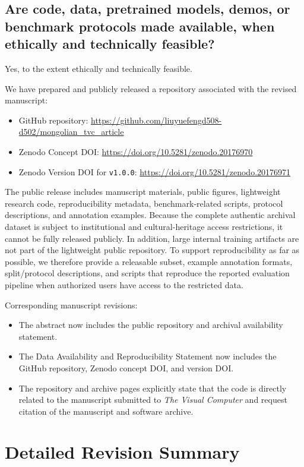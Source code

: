 \documentclass[11pt]{article}
\begin{document}
\subsection{Are code, data, pretrained models, demos, or benchmark protocols made available, when ethically and technically feasible?}

Yes, to the extent ethically and technically feasible.

We have prepared and publicly released a repository associated with the revised manuscript:
\begin{itemize}[leftmargin=1.5em]
\item GitHub repository: \url{https://github.com/liuyuefengd508-d502/mongolian_tvc_article}
\item Zenodo Concept DOI: \url{https://doi.org/10.5281/zenodo.20176970}
\item Zenodo Version DOI for \texttt{v1.0.0}: \url{https://doi.org/10.5281/zenodo.20176971}
\end{itemize}

The public release includes manuscript materials, public figures, lightweight research code, reproducibility metadata, benchmark-related scripts, protocol descriptions, and annotation examples. Because the complete authentic archival dataset is subject to institutional and cultural-heritage access restrictions, it cannot be fully released publicly. In addition, large internal training artifacts are not part of the lightweight public repository. To support reproducibility as far as possible, we therefore provide a releasable subset, example annotation formats, split/protocol descriptions, and scripts that reproduce the reported evaluation pipeline when authorized users have access to the restricted data.

Corresponding manuscript revisions:
\begin{itemize}[leftmargin=1.5em]
\item The abstract now includes the public repository and archival availability statement.
\item The Data Availability and Reproducibility Statement now includes the GitHub repository, Zenodo concept DOI, and version DOI.
\item The repository and archive pages explicitly state that the code is directly related to the manuscript submitted to \textit{The Visual Computer} and request citation of the manuscript and software archive.
\end{itemize}

\section{Detailed Revision Summary}
\end{document}

